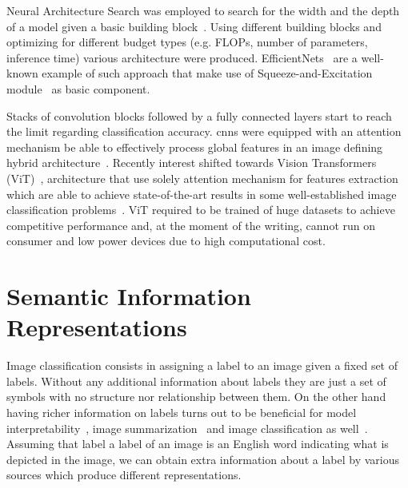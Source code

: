 Neural Architecture Search was employed to search for the width and the depth
of a model given a basic building block~\cite{ProgressiveNeuLiuC2017,
GeneticCnnXieL2017, LargeScaleEvoReal2017, RegularizedEvoReal2018}. Using
different building blocks and optimizing for different budget types (e.g.
FLOPs, number of parameters, inference time) various architecture were
produced. EfficientNets~\cite{EfficientnetRTanM2019, Efficientnetv2TanM2021}
are a well-known example of such approach that make use of
Squeeze-and-Excitation module~\cite{SqueezeAndExcHuJi2017} as basic component.

Stacks of convolution blocks followed by a fully connected layers start to
reach the limit regarding classification accuracy. \acrshort{cnn}s were
equipped with an attention mechanism be able to effectively process global
features in an image defining hybrid
architecture~\cite{SpatialTransfoJaderb2015, LookAndThinkCaoC2015,
ShowAttendAnXuKe2015, ScaCnnSpatiaChen2016}. Recently interest shifted towards
Vision Transformers (ViT)~\cite{AnImageIsWorDosovi2020}, architecture that use
solely attention mechanism for features extraction which are able to achieve
state-of-the-art results in some well-established image classification
problems~\cite{TransformersInKhan2021, ASurveyOnVisHanK2023}. ViT required to
be trained of huge datasets to achieve competitive performance and, at the
moment of the writing, cannot run on consumer and low power devices due to high
computational cost.

\section{Semantic Information Representations}
\label{sec:semantic-information-sources}
Image classification consists in assigning a label to an image given a fixed
set of labels. Without any additional information about labels they are just a
set of symbols with no structure nor relationship between them. On the other
hand having richer information on labels turns out to be beneficial for model
interpretability~\cite{ImprovingInterDong2017}, image
summarization~\cite{SemanticImagePasini2022} and image classification as
well~\cite{MakingBetterMBertin2019}. Assuming that label a label of an image is
an English word indicating what is depicted in the image, we can obtain extra
information about a label by various sources which produce different
representations.

